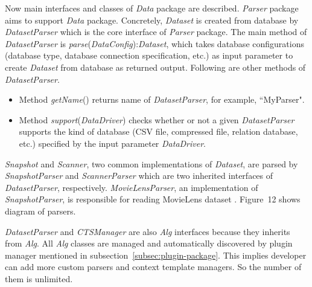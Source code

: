 \documentclass[a4paper]{llncs}
\begin{document}
Now main interfaces and classes of \textit{Data} package are described. \textit{Parser} package aims to support \textit{Data} package. Concretely, \textit{Dataset} is created from database by \textit{DatasetParser} which is the core interface of \textit{Parser} package. The main method of \textit{DatasetParser} is \textit{parse}(\textit{DataConfig}):\textit{Dataset}, which takes database configurations (database type, database connection specification, etc.) as input parameter to create \textit{Dataset} from database as returned output. Following are other methods of \textit{DatasetParser}.
\begin{itemize}
\item Method \textit{getName}() returns name of \textit{DatasetParser}, for example, ``MyParser".
\item Method \textit{support}(\textit{DataDriver}) checks whether or not a given \textit{DatasetParser} supports the kind of database (CSV file, compressed file, relation database, etc.) specified by the input parameter \textit{DataDriver}.
\end{itemize}
\textit{Snapshot} and \textit{Scanner}, two common implementations of \textit{Dataset}, are parsed by \textit{SnapshotParser} and \textit{ScannerParser} which are two inherited interfaces of \textit{DatasetParser}, respectively. \textit{MovieLensParser}, an implementation of \textit{SnapshotParser}, is responsible for reading MovieLens dataset \cite{movielens}. Figure~12 shows diagram of parsers.

\textit{DatasetParser} and \textit{CTSManager} are also \textit{Alg} interfaces because they inherits from \textit{Alg}. All \textit{Alg} classes are managed and automatically discovered by plugin manager mentioned in subsection~\ref{subsec:plugin-package}. This implies developer can add more custom parsers and context template managers. So the number of them is unlimited.
\end{document}
